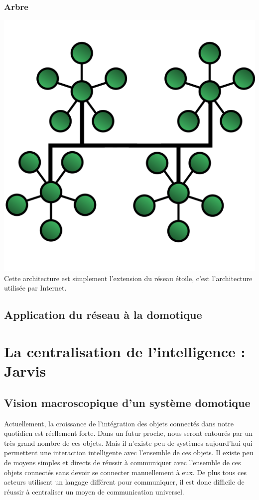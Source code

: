 	    \subsubsection{Arbre}
\includegraphics{img/TreeTopology.png}
Cette architecture est simplement l'extension du réseau étoile, c'est l'architecture utilisée par Internet.
	\subsection{Application du réseau à la domotique}



\section{La centralisation de l’intelligence : Jarvis}
	\subsection{Vision macroscopique d’un système domotique}
Actuellement, la croissance de l'intégration des objets connectés dans notre quotidien est réellement forte. 
Dans un futur proche, nous seront entourés par un très grand nombre de ces objets. Mais il n'existe peu de 
systèmes aujourd'hui qui permettent une interaction intelligente avec l'ensemble de ces objets. Il existe peu 
de moyens simples et directs de réussir à communiquer avec l'ensemble de ces objets connectés sans devoir se 
connecter manuellement à eux. De plus tous ces acteurs utilisent un langage différent pour communiquer, il 
est donc difficile de réussir à centraliser un moyen de communication universel.

